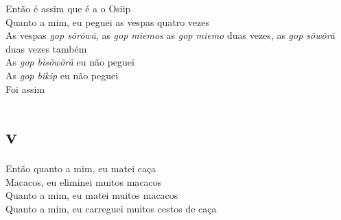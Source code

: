 \begin{linenumbers}\begingroup\raggedright
 
\noindent  Então é assim que é a o Osiip\\
 Quanto a mim, eu peguei as vespas quatro vezes\\
 As vespas \emph{gop sõrõwã}, as \emph{gop miemos} as \emph{gop miemo} duas vezes, as \emph{gop sõwõrã} duas vezes também\\
 As \emph{gop bisõwõrã} eu não peguei\\
 As \emph{gop bikip} eu não peguei\\
 Foi assim
 
 
 \medskip
\section{v}

 \noindent Então quanto a mim, eu matei caça\\
 Macacos, eu eliminei muitos macacos\\
 Quanto a mim, eu matei muitos macacos\\
 Quanto a mim, eu carreguei muitos cestos de caça
 
\end{linenumbers}\endgroup

\bigskip

